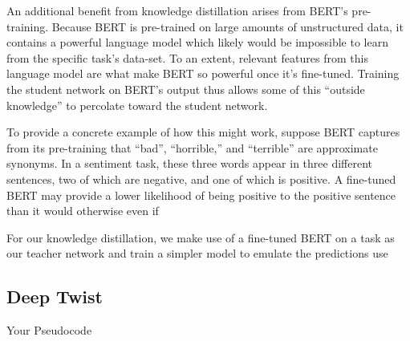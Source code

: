 \documentclass[10pt]{article}
\begin{document}
An additional benefit from knowledge distillation arises from BERT's
pre-training. Because BERT is pre-trained on large amounts of unstructured
data, it contains a powerful language model which likely would be impossible
to learn from the specific task's data-set. To an extent, relevant features
from this language model are what make BERT so powerful once it's fine-tuned.
Training the student network on BERT's output thus allows some of this
``outside knowledge'' to percolate toward the student network.

To provide a concrete example of how this might work, suppose BERT captures
from its pre-training that ``bad'', ``horrible,'' and ``terrible'' are
approximate synonyms. In a sentiment task, these three words appear in three
different sentences, two of which are negative, and one of which is positive.
A fine-tuned BERT may provide a lower likelihood of being positive to the
positive sentence than it would otherwise even if



For our knowledge distillation, we make use of a fine-tuned BERT on a task as
our teacher network and train a simpler model to emulate the predictions use



\subsection{Deep Twist}



\begin{comment}
\begin{itemize}
\item How do you plan on training your parameters / inferring the
  states of your latent variables (MLE / MAP / Backprop / VI / EM / BP / ...)

\item What are the assumptions implicit in this technique? Is it an approximation or exact? If it is an approximation what bound does it optimize?

\item What is the explicit method / algorithm that you derive for learning these parameters?
\end{itemize}
\end{comment}

\begin{algorithm}
  \begin{algorithmic}
    \STATE{}
  \end{algorithmic}
  \caption{Your Pseudocode}
\end{algorithm}
\end{document}
